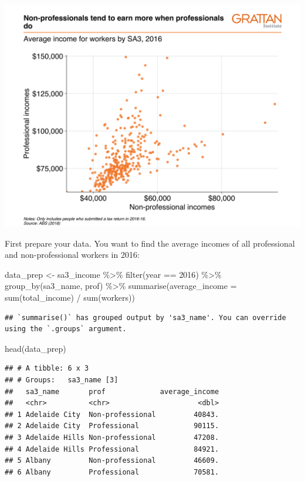 \documentclass[
]{book}
\newenvironment{Shaded}{\begin{snugshade}}{\end{snugshade}}
\newcommand{\AttributeTok}[1]{\textcolor[rgb]{0.77,0.63,0.00}{#1}}
\newcommand{\DecValTok}[1]{\textcolor[rgb]{0.00,0.00,0.81}{#1}}
\newcommand{\FunctionTok}[1]{\textcolor[rgb]{0.00,0.00,0.00}{#1}}
\newcommand{\NormalTok}[1]{#1}
\newcommand{\OtherTok}[1]{\textcolor[rgb]{0.56,0.35,0.01}{#1}}
\newcommand{\SpecialCharTok}[1]{\textcolor[rgb]{0.00,0.00,0.00}{#1}}
\begin{document}
\includegraphics{atlas/scatter_reshape.png}

First prepare your data. You want to find the average incomes of all professional and non-professional workers in 2016:

\begin{Shaded}
\begin{Highlighting}[]
\NormalTok{data\_prep }\OtherTok{\textless{}{-}}\NormalTok{ sa3\_income }\SpecialCharTok{\%\textgreater{}\%} 
  \FunctionTok{filter}\NormalTok{(year }\SpecialCharTok{==} \DecValTok{2016}\NormalTok{) }\SpecialCharTok{\%\textgreater{}\%} 
  \FunctionTok{group\_by}\NormalTok{(sa3\_name, prof) }\SpecialCharTok{\%\textgreater{}\%} 
  \FunctionTok{summarise}\NormalTok{(}\AttributeTok{average\_income =} \FunctionTok{sum}\NormalTok{(total\_income) }\SpecialCharTok{/} \FunctionTok{sum}\NormalTok{(workers))}
\end{Highlighting}
\end{Shaded}

\begin{verbatim}
## `summarise()` has grouped output by 'sa3_name'. You can override using the `.groups` argument.
\end{verbatim}

\begin{Shaded}
\begin{Highlighting}[]
\FunctionTok{head}\NormalTok{(data\_prep)}
\end{Highlighting}
\end{Shaded}

\begin{verbatim}
## # A tibble: 6 x 3
## # Groups:   sa3_name [3]
##   sa3_name       prof             average_income
##   <chr>          <chr>                     <dbl>
## 1 Adelaide City  Non-professional         40843.
## 2 Adelaide City  Professional             90115.
## 3 Adelaide Hills Non-professional         47208.
## 4 Adelaide Hills Professional             84921.
## 5 Albany         Non-professional         46609.
## 6 Albany         Professional             70581.
\end{verbatim}
\end{document}
